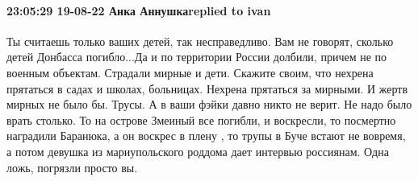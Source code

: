  
 
 
 
 

\paragraph{23:05:29 19-08-22 Анка Аннушкаreplied to ivan}

Ты считаешь только ваших детей, так несправедливо. Вам не говорят, сколько детей Донбасса погибло...Да и по территории России долбили, причем не по военным объектам. Страдали мирные и дети. Скажите своим, что нехрена прятаться в садах и школах, больницах. Нехрена прятаться за мирными. И жертв мирных не было бы. Трусы.
А в ваши фэйки давно никто не верит. Не надо было врать столько.
То на острове Змеиный все погибли, и воскресли, то посмертно наградили Баранюка, а он воскрес в плену , то трупы в Буче встают не вовремя, а потом девушка из мариупольского роддома дает интервью россиянам. Одна ложь, погрязли просто вы.
